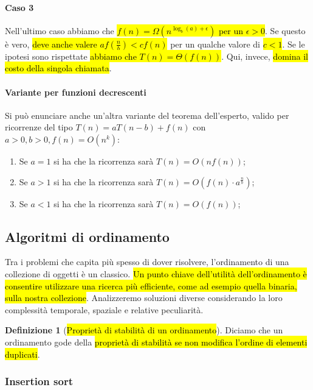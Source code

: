 \documentclass[a4paper,11pt,twoside]{article}
\theoremstyle{plain}
\theoremstyle{definition}
\newtheorem{defn}{Definizione}[section]
\theoremstyle{remark}
\begin{document}
\paragraph{Caso 3} Nell'ultimo caso abbiamo che \hl{$f(n) = \Omega(n^{\log_b(a)
+ \epsilon})$ per un $\epsilon >0$}. Se questo è vero, \hl{deve anche valere
$af(\frac{n}{b})<cf(n)$} per un qualche valore di \hl{$c<1$}. Se le ipotesi sono
rispettate \hl{abbiamo che $T(n) = \Theta(f(n))$}. Qui, invece, \hl{domina il
costo della singola chiamata}.

\paragraph{Variante per funzioni decrescenti} Si può enunciare anche un'altra
variante del teorema dell'esperto, valido per ricorrenze del tipo $T(n) = aT(n -
b) + f(n)$ con $a > 0, b > 0, f(n) = O(n^k)$:

\begin{enumerate}
  \item Se $a = 1$ si ha che la ricorrenza sarà $T(n) = O(nf(n))$;
  \item Se $a > 1$ si ha che la ricorrenza sarà $T(n) = O(f(n) \cdot a^{\frac{n}{b}})$;
  \item Se $a < 1$ si ha che la ricorrenza sarà $T(n) = O(f(n))$;
\end{enumerate}

\subsection{Algoritmi di ordinamento}\label{sec:alg-odinamento}

Tra i problemi che capita più spesso di dover risolvere, l'ordinamento di una
collezione di oggetti è un classico. \hl{Un punto chiave dell'utilità
dell'ordinamento è consentire utilizzare una ricerca più efficiente, come ad
esempio quella binaria, sulla nostra collezione}. Analizzeremo soluzioni diverse
considerando la loro complessità temporale, spaziale e relative peculiarità.

\begin{defn}[\hl{Proprietà di stabilità di un ordinamento}]\label{def:prop-stabilita}
  Diciamo che un ordinamento gode della \hl{proprietà di stabilità se non
  modifica l'ordine di elementi duplicati}.
\end{defn}

\subsubsection{Insertion sort}\label{sec:insertion-sort}
\end{document}
